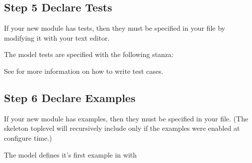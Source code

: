 \documentclass[letterpaper,10pt,english]{sphinxmanual}
\renewcommand{\sphinxcode}[1]{\texttt{\small{#1}}}
\begin{document}
\begin{sphinxVerbatim}[commandchars=\\\{\}]
 
\end{sphinxVerbatim}


\subsection{Step 5 \sphinxhyphen{} Declare Tests}
\label{\detokenize{new-modules:step-5-declare-tests}}
If your new module has tests, then they must be specified in your
\sphinxcode{} file by modifying it with your text editor.

The \sphinxcode{} model tests are specified with the following stanza:

\begin{sphinxVerbatim}[commandchars=\\\{\}]
  

  \PYG{p}{[}
    \PYG{p}{]}
\end{sphinxVerbatim}

See {\hyperref[\detokenize{tests::doc}]{}} for more information on how to write test cases.


\subsection{Step 6 \sphinxhyphen{} Declare Examples}
\label{\detokenize{new-modules:step-6-declare-examples}}
If your new module has examples, then they must be specified in your
\sphinxcode{} file.  (The skeleton top\sphinxhyphen{}level \sphinxcode{} will
recursively include \sphinxcode{} only if the examples were
enabled at configure time.)

The \sphinxcode{} model defines it’s first example in
\sphinxcode{} with
\end{document}
